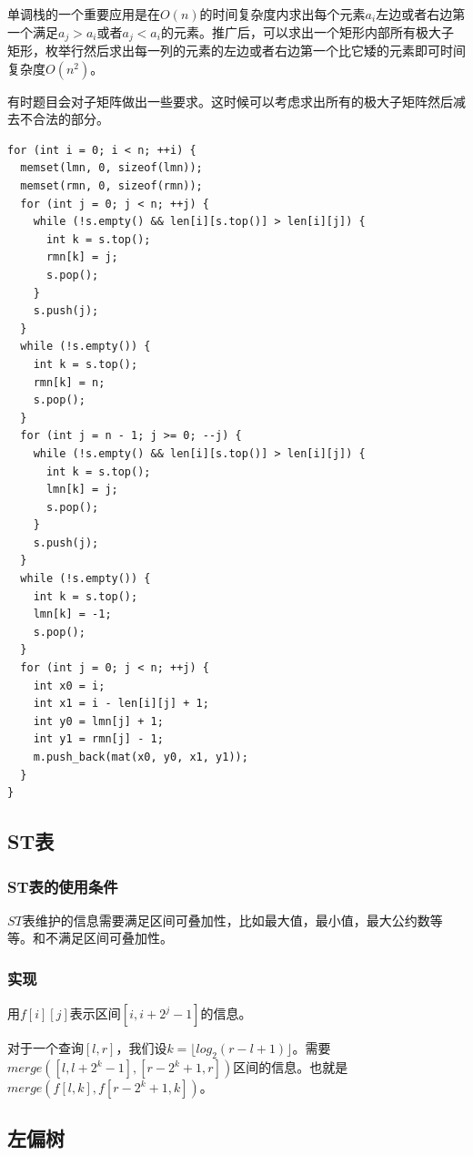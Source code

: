 \documentclass[11pt]{article}
\begin{document}
单调栈的一个重要应用是在\(O(n)\)的时间复杂度内求出每个元素\(a_i\)左边或者右边第一个满足\(a_j > a_i\)或者\(a_j < a_i\)的元素。推广后，可以求出一个矩形内部所有极大子矩形，枚举行然后求出每一列的元素的左边或者右边第一个比它矮的元素即可时间复杂度\(O(n^2)\)。

有时题目会对子矩阵做出一些要求。这时候可以考虑求出所有的极大子矩阵然后减去不合法的部分。

\begin{verbatim}
for (int i = 0; i < n; ++i) {
  memset(lmn, 0, sizeof(lmn));
  memset(rmn, 0, sizeof(rmn));
  for (int j = 0; j < n; ++j) {
    while (!s.empty() && len[i][s.top()] > len[i][j]) {
      int k = s.top();
      rmn[k] = j;
      s.pop();
    }
    s.push(j);
  }
  while (!s.empty()) {
    int k = s.top();
    rmn[k] = n;
    s.pop();
  }
  for (int j = n - 1; j >= 0; --j) {
    while (!s.empty() && len[i][s.top()] > len[i][j]) {
      int k = s.top();
      lmn[k] = j;
      s.pop();
    }
    s.push(j);
  }
  while (!s.empty()) {
    int k = s.top();
    lmn[k] = -1;
    s.pop();
  }
  for (int j = 0; j < n; ++j) {
    int x0 = i;
    int x1 = i - len[i][j] + 1;
    int y0 = lmn[j] + 1;
    int y1 = rmn[j] - 1;
    m.push_back(mat(x0, y0, x1, y1));
  }
}
\end{verbatim}

\subsection{ST表}
\label{sec-6-2}

\subsubsection{ST表的使用条件}
\label{sec-6-2-1}

\(ST\)表维护的信息需要满足区间可叠加性，比如最大值，最小值，最大公约数等等。和不满足区间可叠加性。

\subsubsection{实现}
\label{sec-6-2-2}

用\(f[i][j]\)表示区间\([i,i+2^j-1]\)的信息。

对于一个查询\([l,r]\)，我们设\(k=\lfloor log_2(r-l+1) \rfloor\)。需要\(merge([l,l+2^k -1],[r-2^k+1,r])\)区间的信息。也就是\(merge(f[l,k],f[r-2^k+1,k])\)。
\subsection{左偏树}
\label{sec-6-3}
\end{document}
